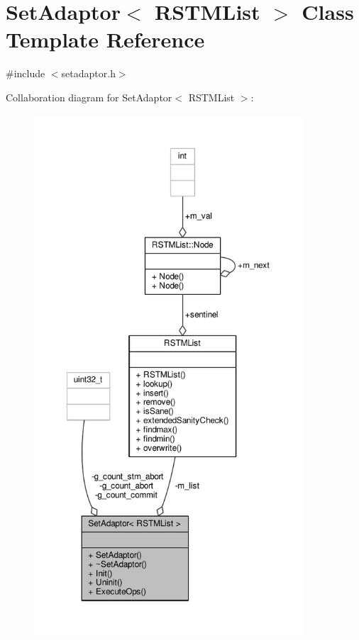 \hypertarget{classSetAdaptor_3_01RSTMList_01_4}{\section{Set\-Adaptor$<$ R\-S\-T\-M\-List $>$ Class Template Reference}
\label{classSetAdaptor_3_01RSTMList_01_4}
}


{\ttfamily \#include $<$setadaptor.\-h$>$}



Collaboration diagram for Set\-Adaptor$<$ R\-S\-T\-M\-List $>$\-:
\nopagebreak
\begin{figure}[H]
\begin{center}
\leavevmode
\includegraphics[height=550pt]{classSetAdaptor_3_01RSTMList_01_4__coll__graph}
\end{center}
\end{figure}
